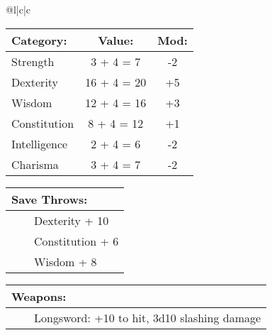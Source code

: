 \documentclass[11pt]{article}
\newcommand{\tabitem}{~~\llap{--}~~}
\begin{document}
\begin{multicols}{2}
\vspace{4mm}

\noindent \begin{tabularx}{\linewidth}{@{}l|c|c}
 \\
\hline
		\end{tabularx}
\noindent \begin{tabular}{@{}l|c|c}
\textbf{Category:} 			& \textbf{Value:} 	& \textbf{Mod:} \\
\hline
Strength 					& 3 + 4 = 7			& -2		\\
Dexterity 					& 16 + 4 = 20 		& +5		\\
Wisdom 						& 12 + 4 = 16		& +3		\\
Constitution 				& 8 + 4 = 12 		& +1		\\
Intelligence 				& 2 + 4 = 6		 	& -2		\\
Charisma 					& 3 + 4 = 7		 	& -2
		\end{tabular}

\vspace{4mm}

\noindent \begin{tabularx}{\linewidth}{@{}l}
{\Large \textbf{Save Throws:}} \\
\hline
\tabitem Dexterity + 10 \\
\tabitem Constitution + 6 \\
\tabitem Wisdom + 8
		\end{tabularx}

\vspace{4mm}

\noindent \begin{tabularx}{\linewidth}{@{}l}
{\Large \textbf{Weapons:}} \\
\hline
\tabitem Longsword: +10 to hit, 3d10 slashing damage \\
		\end{tabularx}

\vspace{4mm}


\end{multicols}
\end{document}
